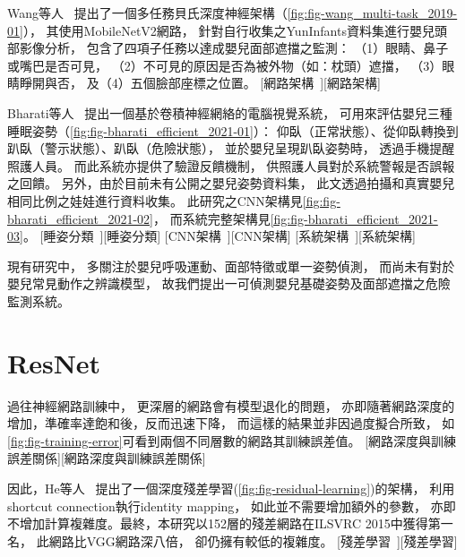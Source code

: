 \documentclass[class=NCU_thesis, crop=false]{standalone}
\begin{document}
Wang等人~\cite{wang_multi-task_2019}
提出了一個多任務貝氏深度神經架構（\cref{fig:fig-wang_multi-task_2019-01}），
其使用MobileNetV2網路，
針對自行收集之YunInfants資料集進行嬰兒頭部影像分析，
包含了四項子任務以達成嬰兒面部遮擋之監測：
（1）眼睛、鼻子或嘴巴是否可見，
（2）不可見的原因是否為被外物（如：枕頭）遮擋，
（3）眼睛睜開與否，
及（4）五個臉部座標之位置。
[網路架構~\cite{wang_multi-task_2019}][網路架構]

Bharati等人~\cite{bharati_efficient_2021}
提出一個基於卷積神經網絡的電腦視覺系統，
可用來評估嬰兒三種睡眠姿勢（\cref{fig:fig-bharati_efficient_2021-01}）：
仰臥（正常狀態）、從仰臥轉換到趴臥（警示狀態）、趴臥（危險狀態），
並於嬰兒呈現趴臥姿勢時，
透過手機提醒照護人員。
而此系統亦提供了驗證反饋機制，
供照護人員對於系統警報是否誤報之回饋。
另外，由於目前未有公開之嬰兒姿勢資料集，
此文透過拍攝和真實嬰兒相同比例之娃娃進行資料收集。
此研究之CNN架構見\cref{fig:fig-bharati_efficient_2021-02}，
而系統完整架構見\cref{fig:fig-bharati_efficient_2021-03}。
[睡姿分類~\cite{bharati_efficient_2021}][睡姿分類]
[CNN架構~\cite{bharati_efficient_2021}][CNN架構]
[系統架構~\cite{bharati_efficient_2021}][系統架構]

現有研究中，
多關注於嬰兒呼吸運動、面部特徵或單一姿勢偵測，
而尚未有對於嬰兒常見動作之辨識模型，
故我們提出一可偵測嬰兒基礎姿勢及面部遮擋之危險監測系統。

\section{ResNet}
過往神經網路訓練中，
更深層的網路會有模型退化的問題，
亦即隨著網路深度的增加，準確率達飽和後，反而迅速下降，
而這樣的結果並非因過度擬合所致，
如\cref{fig:fig-training-error}可看到兩個不同層數的網路其訓練誤差值。
[網路深度與訓練誤差關係][網路深度與訓練誤差關係]

因此，He等人~\cite{he_deep_2016}
提出了一個深度殘差學習(\cref{fig:fig-residual-learning})的架構，
利用shortcut connection執行identity mapping，
如此並不需要增加額外的參數，
亦即不增加計算複雜度。最終，本研究以152層的殘差網路在ILSVRC 2015中獲得第一名，
此網路比VGG網路深八倍，
卻仍擁有較低的複雜度。
[殘差學習~\cite{he_deep_2016}][殘差學習]
\end{document}
